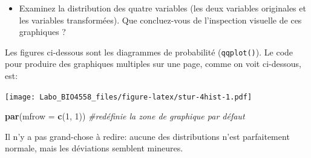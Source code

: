 \documentclass[12pt,]{book}
\newenvironment{Shaded}{\begin{snugshade}}{\end{snugshade}}
\newcommand{\CommentTok}[1]{\textcolor[rgb]{0.37,0.37,0.37}{\textit{#1}}}
\newcommand{\DataTypeTok}[1]{\textcolor[rgb]{0.27,0.27,0.27}{#1}}
\newcommand{\DecValTok}[1]{\textcolor[rgb]{0.06,0.06,0.06}{#1}}
\newcommand{\KeywordTok}[1]{\textcolor[rgb]{0.27,0.27,0.27}{\textbf{#1}}}
\newcommand{\NormalTok}[1]{#1}
\newcommand{\OperatorTok}[1]{\textcolor[rgb]{0.43,0.43,0.43}{\textbf{#1}}}
\newcommand{\StringTok}[1]{\textcolor[rgb]{0.5,0.5,0.5}{#1}}
\providecommand{\tightlist}{%
  \setlength{\itemsep}{0pt}\setlength{\parskip}{0pt}}
\begin{document}
\begin{itemize}
\tightlist
\item
  Examinez la distribution des quatre variables (les deux variables originales et les variables transformées). Que concluez-vous de l'inspection visuelle de ces graphiques ?
\end{itemize}

Les figures ci-dessous sont les diagrammes de probabilité (\texttt{qqplot()}).
Le code pour produire des graphiques multiples sur une page, comme
on voit ci-dessous, est:

\begin{Shaded}
\end{Shaded}

\texttt{[image: Labo\_BIO4558\_files/figure-latex/stur-4hist-1.pdf]}

\begin{Shaded}
\begin{Highlighting}[]
\KeywordTok{par}\NormalTok{(}\DataTypeTok{mfrow =} \KeywordTok{c}\NormalTok{(}\DecValTok{1}\NormalTok{, }\DecValTok{1}\NormalTok{)) }\CommentTok{#redéfinie la zone de graphique par défaut}
\end{Highlighting}
\end{Shaded}

Il n'y a pas grand-chose à redire: aucune des distributions n'est
parfaitement normale, mais les déviations semblent mineures.
\end{document}
